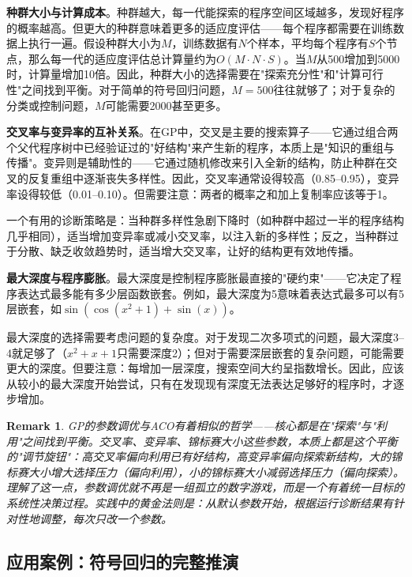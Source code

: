 \documentclass[lang=cn,zihao=-4,a4paper,fontset=windows]{beautybook}
\newtheorem*{remark}{\textbf{Remark}}
\begin{document}
\textbf{种群大小与计算成本}。种群越大，每一代能探索的程序空间区域越多，发现好程序的概率越高。但更大的种群意味着更多的适应度评估——每个程序都需要在训练数据上执行一遍。假设种群大小为$M$，训练数据有$N$个样本，平均每个程序有$S$个节点，那么每一代的适应度评估总计算量约为$O(M \cdot N \cdot S)$。当$M$从500增加到5000时，计算量增加10倍。因此，种群大小的选择需要在"探索充分性"和"计算可行性"之间找到平衡。对于简单的符号回归问题，$M = 500$往往就够了；对于复杂的分类或控制问题，$M$可能需要2000甚至更多。

\textbf{交叉率与变异率的互补关系}。在GP中，交叉是主要的搜索算子——它通过组合两个父代程序树中已经验证过的"好结构"来产生新的程序，本质上是"知识的重组与传播"。变异则是辅助性的——它通过随机修改来引入全新的结构，防止种群在交叉的反复重组中逐渐丧失多样性。因此，交叉率通常设得较高（0.85--0.95），变异率设得较低（0.01--0.10）。但需要注意：两者的概率之和加上复制率应该等于1。

一个有用的诊断策略是：当种群多样性急剧下降时（如种群中超过一半的程序结构几乎相同），适当增加变异率或减小交叉率，以注入新的多样性；反之，当种群过于分散、缺乏收敛趋势时，适当增大交叉率，让好的结构更有效地传播。

\textbf{最大深度与程序膨胀}。最大深度是控制程序膨胀最直接的"硬约束"——它决定了程序表达式最多能有多少层函数嵌套。例如，最大深度为5意味着表达式最多可以有5层嵌套，如$\sin(\cos(x^2 + 1) + \sin(x))$。

最大深度的选择需要考虑问题的复杂度。对于发现二次多项式的问题，最大深度3--4就足够了（$x^2 + x + 1$只需要深度2）；但对于需要深层嵌套的复杂问题，可能需要更大的深度。但要注意：每增加一层深度，搜索空间大约呈指数增长。因此，应该从较小的最大深度开始尝试，只有在发现现有深度无法表达足够好的程序时，才逐步增加。

\begin{remark}
GP的参数调优与ACO有着相似的哲学——核心都是在"探索"与"利用"之间找到平衡。交叉率、变异率、锦标赛大小这些参数，本质上都是这个平衡的"调节旋钮"：高交叉率偏向利用已有好结构，高变异率偏向探索新结构，大的锦标赛大小增大选择压力（偏向利用），小的锦标赛大小减弱选择压力（偏向探索）。理解了这一点，参数调优就不再是一组孤立的数字游戏，而是一个有着统一目标的系统性决策过程。实践中的黄金法则是：从默认参数开始，根据运行诊断结果有针对性地调整，每次只改一个参数。
\end{remark}

\subsection{应用案例：符号回归的完整推演}
\end{document}
